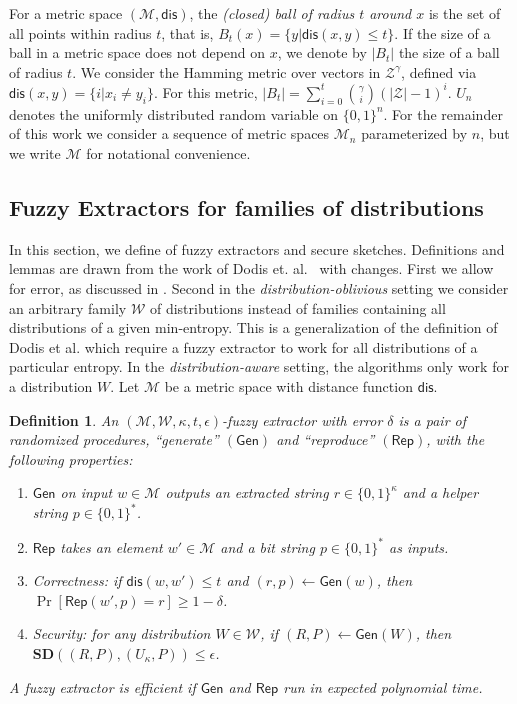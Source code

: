 \documentclass[11pt]{article}
\newcommand{\class}[1]{{\ensuremath{\mathsf{#1}}}}
\newcommand{\gen}{\ensuremath{\class{Gen}}\xspace}
\newcommand{\rep}{\ensuremath{\class{Rep}}\xspace}
\newcommand{\dis}{\ensuremath{\mathsf{dis}}}
\newtheorem{definition}[theorem]{Definition}
\begin{document}
For a metric space $(\mathcal{M}, \dis)$, the \emph{(closed) ball of radius $t$ around $x$} is the set of all points within radius $t$, that is, $B_t(x) = \{y| \dis(x, y)\leq t\}$.  If the size of a ball in a metric space does not depend on $x$, we denote by $|B_t|$ the size of a ball of radius $t$.  We consider the Hamming metric over vectors in $\mathcal{Z}^\gamma$, defined via $\dis(x,y) = \{i | x_i \neq y_i\}$.  For this metric, $|B_t| = \sum_{i=0}^t {\gamma \choose i} (|\mathcal{Z}|-1)^i $.  $U_n$ denotes the uniformly  distributed random variable on $\{0,1\}^n$.  For the remainder of this work we consider a sequence of metric spaces $\mathcal{M}_n$ parameterized by $n$, but we write $\mathcal{M}$ for notational convenience.

\subsection{Fuzzy Extractors for families of distributions}\label{sec:fuzz extractor}

In this section, we define of fuzzy extractors and secure sketches.  Definitions and lemmas are drawn from the work of Dodis et. al.~\cite[Sections 2.5--4.1]{DBLP:journals/siamcomp/DodisORS08} with changes.  First we allow for error, as discussed in \cite[Sections 8]{DBLP:journals/siamcomp/DodisORS08}.  Second in the \emph{distribution-oblivious} setting we consider an arbitrary family $\mathcal{W}$ of distributions instead of families containing all distributions of a given min-entropy.  This is a generalization of the definition of Dodis et al. which require a fuzzy extractor to work for all distributions of a particular entropy.  In the \emph{distribution-aware} setting, the algorithms only work for a distribution $W$.  Let $\mathcal{M}$ be a metric space with distance function $\dis$.

\begin{definition}
\label{def:fuzzy extractor}
An $(\mathcal{M}, \mathcal{W}, \kappa, t, \epsilon)$-\emph{fuzzy extractor} with error $\delta$ is a pair of randomized procedures, ``generate'' $(\gen)$ and ``reproduce'' $(\rep)$, with the following properties: 
\begin{enumerate}
\item \gen on input $w\in \mathcal{M}$ outputs an extracted string $r\in\{0,1\}^\kappa$ and a helper string $p\in\{0,1\}^*$.
\item \rep takes an element $w'\in\mathcal{M}$ and a bit string $p\in\{0,1\}^*$ as inputs.   
\item \emph{Correctness:} if $\dis(w, w')\leq t$ and $(r, p)\leftarrow \gen(w)$, then $\Pr[\rep( w', p) = r] \geq 1-\delta$.
\item \emph{Security:} for any distribution $W\in\mathcal{W}$, if $(R,P)\leftarrow\gen (W)$, then $\mathbf{SD}((R,P),(U_\kappa,P))\leq \epsilon$.
\end{enumerate}
A fuzzy extractor is efficient if $\gen$ and $\rep$ run in expected polynomial time.
\end{definition}
\end{document}
